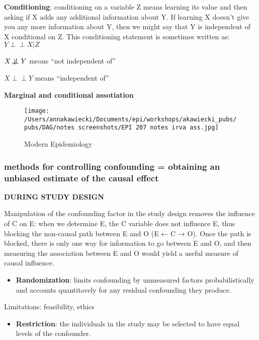 \documentclass[
]{article}
\providecommand{\tightlist}{%
  \setlength{\itemsep}{0pt}\setlength{\parskip}{0pt}}
\begin{document}
\textbf{Conditioning}: conditioning on a variable Z means learning its
value and then asking if X adds any additional information about Y. If
learning X doesn't give you any more information about Y, then we might
say that Y is independent of X conditional on Z. This conditioning
statement is sometimes written as: \(Y \!\perp\!\!\!\perp X|Z\)

\(X \not\!\perp\!\!\!\perp Y\) means ``not independent of''

\(X \!\perp\!\!\!\perp Y\) means ``independent of''

\textbf{Marginal and conditional assotiation}

\begin{figure}
\centering
\texttt{[image: /Users/annakawiecki/Documents/epi/workshops/akawiecki\_pubs/pubs/DAG/notes screenshots/EPI 207 notes irva ass.jpg]}
\caption{Modern Epidemiology}
\end{figure}

\hypertarget{methods-for-controlling-confounding-obtaining-an-unbiased-estimate-of-the-causal-effect}{%
\subsubsection{methods for controlling confounding = obtaining an
unbiased estimate of the causal
effect}\label{methods-for-controlling-confounding-obtaining-an-unbiased-estimate-of-the-causal-effect}}

\textbf{DURING STUDY DESIGN}

Manipulation of the confounding factor in the study design removes the
influence of C on E: when we determine E, the C variable does not
influence E, thus blocking the non-causal path between E and O (E ← C →
O). Once the path is blocked, there is only one way for information to
go between E and O, and then measuring the association between E and O
would yield a useful measure of causal influence.

\begin{itemize}
\tightlist
\item
  \textbf{Randomization}: limits confounding by unmeasured factors
  probabilistically and accounts quantitavely for any residual
  confounding they produce.
\end{itemize}

Limitations: feasibility, ethics

\begin{itemize}
\tightlist
\item
  \textbf{Restriction}: the individuals in the study may be selected to
  have equal levels of the confounder.
\end{itemize}
\end{document}
